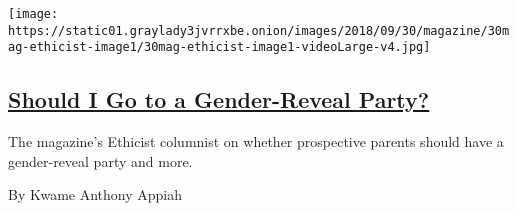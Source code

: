 \begin{enumerate}
  \texttt{[image: https://static01.graylady3jvrrxbe.onion/images/2018/09/30/magazine/30mag-ethicist-image1/30mag-ethicist-image1-videoLarge-v4.jpg]}

  \hypertarget{should-i-go-to-a-gender-reveal-party}{%
  \subsection{\texorpdfstring{\href{/2018/09/25/magazine/should-i-go-to-a-gender-reveal-party.html}{Should
  I Go to a Gender-Reveal
  Party?}}{Should I Go to a Gender-Reveal Party?}}\label{should-i-go-to-a-gender-reveal-party}}

  The magazine's Ethicist columnist on whether prospective parents
  should have a gender-reveal party and more.

  By Kwame Anthony Appiah
\end{enumerate}

